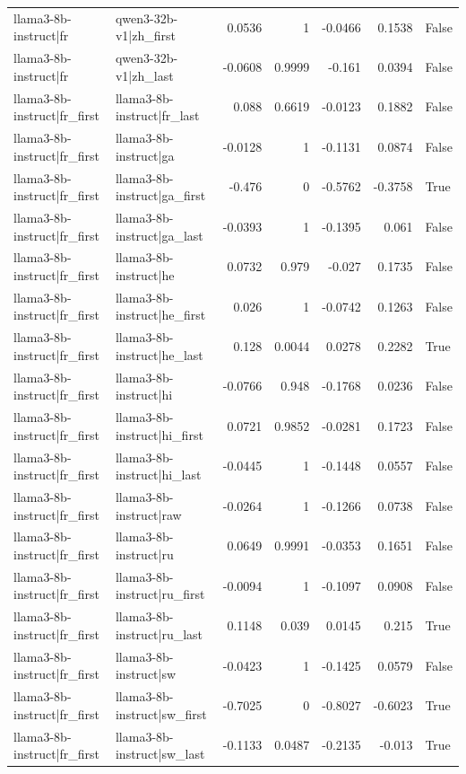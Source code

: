\begin{table}
\begin{tabular}{l l r r r r l}
llama3-8b-instruct|fr & qwen3-32b-v1|zh_first & 0.0536 & 1 & -0.0466 & 0.1538 & False \\
llama3-8b-instruct|fr & qwen3-32b-v1|zh_last & -0.0608 & 0.9999 & -0.161 & 0.0394 & False \\
llama3-8b-instruct|fr_first & llama3-8b-instruct|fr_last & 0.088 & 0.6619 & -0.0123 & 0.1882 & False \\
llama3-8b-instruct|fr_first & llama3-8b-instruct|ga & -0.0128 & 1 & -0.1131 & 0.0874 & False \\
llama3-8b-instruct|fr_first & llama3-8b-instruct|ga_first & -0.476 & 0 & -0.5762 & -0.3758 & True \\
llama3-8b-instruct|fr_first & llama3-8b-instruct|ga_last & -0.0393 & 1 & -0.1395 & 0.061 & False \\
llama3-8b-instruct|fr_first & llama3-8b-instruct|he & 0.0732 & 0.979 & -0.027 & 0.1735 & False \\
llama3-8b-instruct|fr_first & llama3-8b-instruct|he_first & 0.026 & 1 & -0.0742 & 0.1263 & False \\
llama3-8b-instruct|fr_first & llama3-8b-instruct|he_last & 0.128 & 0.0044 & 0.0278 & 0.2282 & True \\
llama3-8b-instruct|fr_first & llama3-8b-instruct|hi & -0.0766 & 0.948 & -0.1768 & 0.0236 & False \\
llama3-8b-instruct|fr_first & llama3-8b-instruct|hi_first & 0.0721 & 0.9852 & -0.0281 & 0.1723 & False \\
llama3-8b-instruct|fr_first & llama3-8b-instruct|hi_last & -0.0445 & 1 & -0.1448 & 0.0557 & False \\
llama3-8b-instruct|fr_first & llama3-8b-instruct|raw & -0.0264 & 1 & -0.1266 & 0.0738 & False \\
llama3-8b-instruct|fr_first & llama3-8b-instruct|ru & 0.0649 & 0.9991 & -0.0353 & 0.1651 & False \\
llama3-8b-instruct|fr_first & llama3-8b-instruct|ru_first & -0.0094 & 1 & -0.1097 & 0.0908 & False \\
llama3-8b-instruct|fr_first & llama3-8b-instruct|ru_last & 0.1148 & 0.039 & 0.0145 & 0.215 & True \\
llama3-8b-instruct|fr_first & llama3-8b-instruct|sw & -0.0423 & 1 & -0.1425 & 0.0579 & False \\
llama3-8b-instruct|fr_first & llama3-8b-instruct|sw_first & -0.7025 & 0 & -0.8027 & -0.6023 & True \\
llama3-8b-instruct|fr_first & llama3-8b-instruct|sw_last & -0.1133 & 0.0487 & -0.2135 & -0.013 & True \\

\end{tabular}
\end{table}
